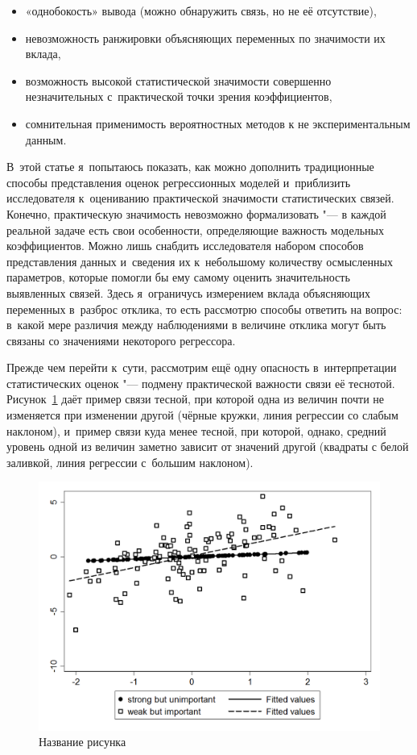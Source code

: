 \documentclass[11pt]{article}
\begin{document}
\begin{itemize}
	\item «однобокость» вывода (можно обнаружить связь, но не её отсутствие), 
	\item невозможность ранжировки объясняющих переменных по значимости их вклада, 
	\item возможность высокой статистической значимости совершенно незначительных с~практической точки зрения коэффициентов,
	\item сомнительная применимость вероятностных методов к не экспериментальным данным.
\end{itemize}

В~этой статье я~попытаюсь показать, как можно дополнить традиционные способы представления оценок регрессионных моделей и~приблизить исследователя к~оцениванию практической значимости статистических связей. Конечно, практическую значимость невозможно формализовать "--- в каждой реальной задаче есть свои особенности, определяющие важность модельных коэффициентов. Можно лишь снабдить исследователя набором способов представления данных и~сведения их к~небольшому количеству осмысленных параметров, которые помогли бы ему самому оценить значительность выявленных связей. Здесь я~ограничусь измерением вклада объясняющих переменных в~разброс отклика, то есть рассмотрю способы ответить на вопрос: в~какой мере различия между наблюдениями в величине отклика могут быть связаны со значениями некоторого регрессора.

Прежде чем перейти к~сути, рассмотрим ещё одну опасность в~интерпретации статистических оценок "--- подмену практической важности связи её теснотой. Рисунок~\ref{fig:regression} даёт пример связи тесной, при которой одна из величин почти не изменяется при изменении другой (чёрные кружки, линия регрессии со слабым наклоном), и~пример связи куда менее тесной, при которой, однако, средний уровень одной из величин заметно зависит от значений другой (квадраты с белой заливкой, линия регрессии с~большим наклоном).

\begin{figure}[htbp]
	\centering
	\includegraphics[width=12cm]{regression.png}
	\caption{Название рисунка}\label{fig:regression}
\end{figure} 
\end{document}
